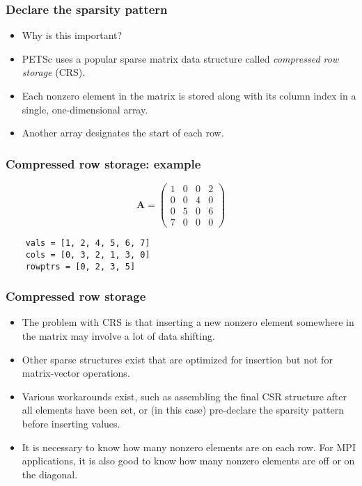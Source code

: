 \begin{frame}
  \frametitle{Declare the sparsity pattern}
  \begin{itemize}
  \item Why is this important?
  \item PETSc uses a popular sparse matrix data structure called
    \emph{compressed row storage} (CRS).
  \item Each nonzero element in the matrix is stored along with its column index
    in a single, one-dimensional array.
  \item Another array designates the start of each row.
  \end{itemize}
\end{frame}

\begin{frame}[fragile]
  \frametitle{Compressed row storage: example}
  \[
    \bm A = \begin{pmatrix}
      1 & 0 & 0 & 2 \\ 0 & 0 & 4 & 0 \\ 0 & 5 & 0 & 6 \\ 7 & 0 & 0 & 0
    \end{pmatrix}
  \]
  \begin{lstlisting}
    vals = [1, 2, 4, 5, 6, 7]
    cols = [0, 3, 2, 1, 3, 0]
    rowptrs = [0, 2, 3, 5]
  \end{lstlisting}
\end{frame}

\begin{frame}
  \frametitle{Compressed row storage}
  \begin{itemize}
  \item The problem with CRS is that inserting a new nonzero element somewhere
    in the matrix may involve a lot of data shifting.
  \item Other sparse structures exist that are optimized for insertion but not
    for matrix-vector operations.
  \item Various workarounds exist, such as assembling the final CSR structure
    after all elements have been set, or (in this case) pre-declare the sparsity
    pattern before inserting values.
  \item It is necessary to know how many nonzero elements are on each row. For
    MPI applications, it is also good to know how many nonzero elements are off
    or on the diagonal.
  \end{itemize}
\end{frame}

